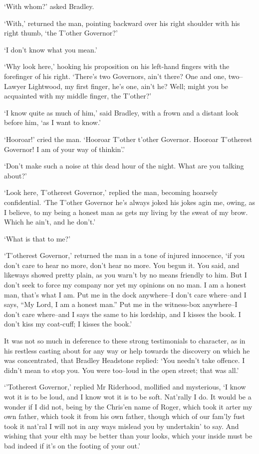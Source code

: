 ‘With whom?’ asked Bradley.

‘With,’ returned the man, pointing backward over his right shoulder with
his right thumb, ‘the T’other Governor?’

‘I don’t know what you mean.’

‘Why look here,’ hooking his proposition on his left-hand fingers with
the forefinger of his right. ‘There’s two Governors, ain’t there? One
and one, two--Lawyer Lightwood, my first finger, he’s one, ain’t he?
Well; might you be acquainted with my middle finger, the T’other?’

‘I know quite as much of him,’ said Bradley, with a frown and a distant
look before him, ‘as I want to know.’

‘Hooroar!’ cried the man. ‘Hooroar T’other t’other Governor. Hooroar
T’otherest Governor! I am of your way of thinkin’.’

‘Don’t make such a noise at this dead hour of the night. What are you
talking about?’

‘Look here, T’otherest Governor,’ replied the man, becoming hoarsely
confidential. ‘The T’other Governor he’s always joked his jokes agin me,
owing, as I believe, to my being a honest man as gets my living by the
sweat of my brow. Which he ain’t, and he don’t.’

‘What is that to me?’

‘T’otherest Governor,’ returned the man in a tone of injured innocence,
‘if you don’t care to hear no more, don’t hear no more. You begun it.
You said, and likeways showed pretty plain, as you warn’t by no means
friendly to him. But I don’t seek to force my company nor yet my
opinions on no man. I am a honest man, that’s what I am. Put me in the
dock anywhere--I don’t care where--and I says, “My Lord, I am a honest
man.” Put me in the witness-box anywhere--I don’t care where--and I
says the same to his lordship, and I kisses the book. I don’t kiss my
coat-cuff; I kisses the book.’

It was not so much in deference to these strong testimonials to
character, as in his restless casting about for any way or help towards
the discovery on which he was concentrated, that Bradley Headstone
replied: ‘You needn’t take offence. I didn’t mean to stop you. You were
too--loud in the open street; that was all.’

‘’Totherest Governor,’ replied Mr Riderhood, mollified and mysterious,
‘I know wot it is to be loud, and I know wot it is to be soft. Nat’rally
I do. It would be a wonder if I did not, being by the Chris’en name of
Roger, which took it arter my own father, which took it from his own
father, though which of our fam’ly fust took it nat’ral I will not in
any ways mislead you by undertakin’ to say. And wishing that your elth
may be better than your looks, which your inside must be bad indeed if
it’s on the footing of your out.’


